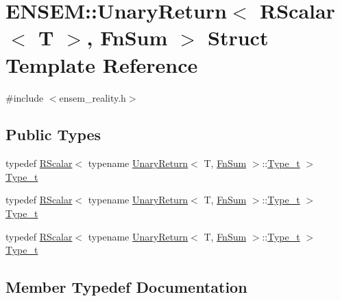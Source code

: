 \hypertarget{structENSEM_1_1UnaryReturn_3_01RScalar_3_01T_01_4_00_01FnSum_01_4}{}\section{E\+N\+S\+EM\+:\+:Unary\+Return$<$ R\+Scalar$<$ T $>$, Fn\+Sum $>$ Struct Template Reference}
\label{structENSEM_1_1UnaryReturn_3_01RScalar_3_01T_01_4_00_01FnSum_01_4}


{\ttfamily \#include $<$ensem\+\_\+reality.\+h$>$}

\subsection*{Public Types}
\begin{DoxyCompactItemize}
\item 
typedef \mbox{\hyperlink{classENSEM_1_1RScalar}{R\+Scalar}}$<$ typename \mbox{\hyperlink{structENSEM_1_1UnaryReturn}{Unary\+Return}}$<$ T, \mbox{\hyperlink{structENSEM_1_1FnSum}{Fn\+Sum}} $>$\+::\mbox{\hyperlink{structENSEM_1_1UnaryReturn_3_01RScalar_3_01T_01_4_00_01FnSum_01_4_aca06bc5e18b4787990a7e7bd5e72d38c}{Type\+\_\+t}} $>$ \mbox{\hyperlink{structENSEM_1_1UnaryReturn_3_01RScalar_3_01T_01_4_00_01FnSum_01_4_aca06bc5e18b4787990a7e7bd5e72d38c}{Type\+\_\+t}}
\item 
typedef \mbox{\hyperlink{classENSEM_1_1RScalar}{R\+Scalar}}$<$ typename \mbox{\hyperlink{structENSEM_1_1UnaryReturn}{Unary\+Return}}$<$ T, \mbox{\hyperlink{structENSEM_1_1FnSum}{Fn\+Sum}} $>$\+::\mbox{\hyperlink{structENSEM_1_1UnaryReturn_3_01RScalar_3_01T_01_4_00_01FnSum_01_4_aca06bc5e18b4787990a7e7bd5e72d38c}{Type\+\_\+t}} $>$ \mbox{\hyperlink{structENSEM_1_1UnaryReturn_3_01RScalar_3_01T_01_4_00_01FnSum_01_4_aca06bc5e18b4787990a7e7bd5e72d38c}{Type\+\_\+t}}
\item 
typedef \mbox{\hyperlink{classENSEM_1_1RScalar}{R\+Scalar}}$<$ typename \mbox{\hyperlink{structENSEM_1_1UnaryReturn}{Unary\+Return}}$<$ T, \mbox{\hyperlink{structENSEM_1_1FnSum}{Fn\+Sum}} $>$\+::\mbox{\hyperlink{structENSEM_1_1UnaryReturn_3_01RScalar_3_01T_01_4_00_01FnSum_01_4_aca06bc5e18b4787990a7e7bd5e72d38c}{Type\+\_\+t}} $>$ \mbox{\hyperlink{structENSEM_1_1UnaryReturn_3_01RScalar_3_01T_01_4_00_01FnSum_01_4_aca06bc5e18b4787990a7e7bd5e72d38c}{Type\+\_\+t}}
\end{DoxyCompactItemize}


\subsection{Member Typedef Documentation}
\mbox{\label{structENSEM_1_1UnaryReturn_3_01RScalar_3_01T_01_4_00_01FnSum_01_4_aca06bc5e18b4787990a7e7bd5e72d38c}} 
